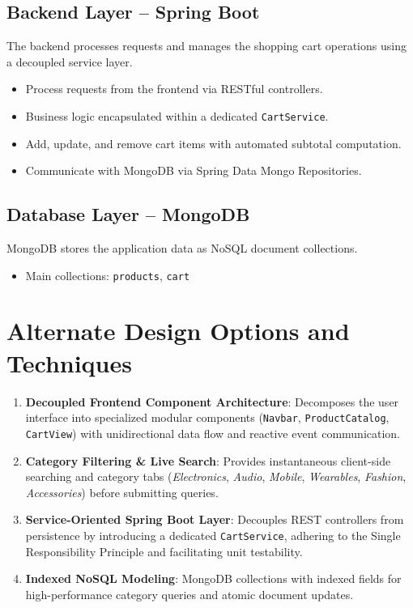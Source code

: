 \documentclass[11pt,a4paper]{article}
\begin{document}
\subsection*{Backend Layer -- Spring Boot}
The backend processes requests and manages the shopping cart operations using a decoupled service layer.
\begin{itemize}
    \item Process requests from the frontend via RESTful controllers.
    \item Business logic encapsulated within a dedicated \texttt{CartService}.
    \item Add, update, and remove cart items with automated subtotal computation.
    \item Communicate with MongoDB via Spring Data Mongo Repositories.
\end{itemize}

\subsection*{Database Layer -- MongoDB}
MongoDB stores the application data as NoSQL document collections.
\begin{itemize}
    \item Main collections: \texttt{products}, \texttt{cart}
\end{itemize}

\section{Alternate Design Options and Techniques}
\begin{enumerate}
    \item \textbf{Decoupled Frontend Component Architecture}: Decomposes the user interface into specialized modular components (\texttt{Navbar}, \texttt{ProductCatalog}, \texttt{CartView}) with unidirectional data flow and reactive event communication.
    \item \textbf{Category Filtering \& Live Search}: Provides instantaneous client-side searching and category tabs (\textit{Electronics}, \textit{Audio}, \textit{Mobile}, \textit{Wearables}, \textit{Fashion}, \textit{Accessories}) before submitting queries.
    \item \textbf{Service-Oriented Spring Boot Layer}: Decouples REST controllers from persistence by introducing a dedicated \texttt{CartService}, adhering to the Single Responsibility Principle and facilitating unit testability.
    \item \textbf{Indexed NoSQL Modeling}: MongoDB collections with indexed fields for high-performance category queries and atomic document updates.
\end{enumerate}
\end{document}
